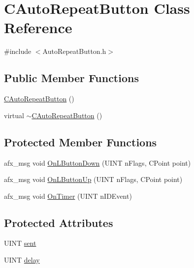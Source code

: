 \hypertarget{classCAutoRepeatButton}{
\section{CAutoRepeatButton Class Reference}
\label{classCAutoRepeatButton}
}


{\ttfamily \#include $<$AutoRepeatButton.h$>$}

\subsection*{Public Member Functions}
\begin{DoxyCompactItemize}
\item 
\hyperlink{classCAutoRepeatButton_a32de4098834f7832ecf7fdcfef85261d}{CAutoRepeatButton} ()
\item 
virtual \hyperlink{classCAutoRepeatButton_ad6c667310aae522d0ded2e4aa39a6d5f}{$\sim$CAutoRepeatButton} ()
\end{DoxyCompactItemize}
\subsection*{Protected Member Functions}
\begin{DoxyCompactItemize}
\item 
afx\_\-msg void \hyperlink{classCAutoRepeatButton_a36d6e9682edcd28761d1d54fa305ffe6}{OnLButtonDown} (UINT nFlags, CPoint point)
\item 
afx\_\-msg void \hyperlink{classCAutoRepeatButton_a4af31e962b23e2c3b66e78e352f0c5a0}{OnLButtonUp} (UINT nFlags, CPoint point)
\item 
afx\_\-msg void \hyperlink{classCAutoRepeatButton_a33f99fec85a8a2bc2ea1861b9e5fff8d}{OnTimer} (UINT nIDEvent)
\end{DoxyCompactItemize}
\subsection*{Protected Attributes}
\begin{DoxyCompactItemize}
\item 
UINT \hyperlink{classCAutoRepeatButton_ac0ea1793c4567d7323ea9dca34f3519d}{sent}
\item 
UINT \hyperlink{classCAutoRepeatButton_ad89ab7692b00411f91e7a78e6f98a466}{delay}
\end{DoxyCompactItemize}


